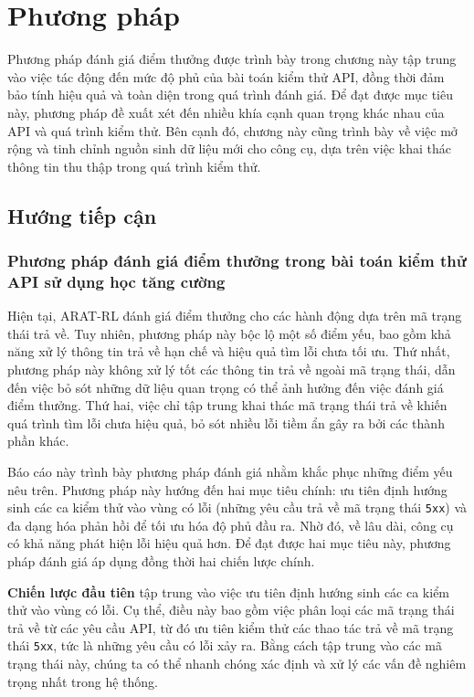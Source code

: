 \chapter{Phương pháp }


Phương pháp đánh giá điểm thưởng được trình bày trong chương này tập trung vào việc tác động đến mức độ phủ của bài toán kiểm thử API, đồng thời đảm bảo tính hiệu quả và toàn diện trong quá trình đánh giá. Để đạt được mục tiêu này, phương pháp đề xuất xét đến nhiều khía cạnh quan trọng khác nhau của API và quá trình kiểm thử. Bên cạnh đó, chương này cũng trình bày về việc mở rộng và tinh chỉnh nguồn sinh dữ liệu mới cho công cụ, dựa trên việc khai thác thông tin thu thập trong quá trình kiểm thử.



\section{Hướng tiếp cận}
\subsection{Phương pháp đánh giá điểm thưởng trong bài toán kiểm thử API sử dụng học tăng cường}




Hiện tại, ARAT-RL đánh giá điểm thưởng cho các hành động dựa trên mã trạng thái trả về. Tuy nhiên, phương pháp này bộc lộ một số điểm yếu, bao gồm khả năng xử lý thông tin trả về hạn chế và hiệu quả tìm lỗi chưa tối ưu. Thứ nhất, phương pháp này không xử lý tốt các thông tin trả về ngoài mã trạng thái, dẫn đến việc bỏ sót những dữ liệu quan trọng có thể ảnh hưởng đến việc đánh giá điểm thưởng. Thứ hai, việc chỉ tập trung khai thác mã trạng thái trả về khiến quá trình tìm lỗi chưa hiệu quả, bỏ sót nhiều lỗi tiềm ẩn gây ra bởi các thành phần khác.

Báo cáo này trình bày phương pháp đánh giá nhằm khắc phục những điểm yếu nêu trên. Phương pháp này hướng đến hai mục tiêu chính: ưu tiên định hướng sinh các ca kiểm thử vào vùng có lỗi (những yêu cầu trả về mã trạng thái \texttt{5xx}) và đa dạng hóa phản hồi để tối ưu hóa độ phủ đầu ra. Nhờ đó, về lâu dài, công cụ có khả năng phát hiện lỗi hiệu quả hơn. Để đạt được hai mục tiêu này, phương pháp đánh giá áp dụng đồng thời hai chiến lược chính.

\textbf{Chiến lược đầu tiên} tập trung vào việc ưu tiên định hướng sinh các ca kiểm thử vào vùng có lỗi. Cụ thể, điều này bao gồm việc phân loại các mã trạng thái trả về từ các yêu cầu API, từ đó ưu tiên kiểm thử các thao tác trả về mã trạng thái \texttt{5xx}, tức là những yêu cầu có lỗi xảy ra. Bằng cách tập trung vào các mã trạng thái này, chúng ta có thể nhanh chóng xác định và xử lý các vấn đề nghiêm trọng nhất trong hệ thống.

